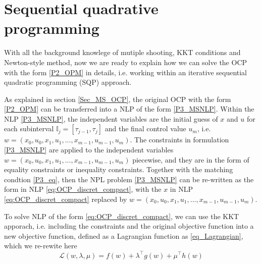 \documentclass  [
  paper    = a4,
  BCOR     = 10mm,
  twoside,
  fontsize = 12pt,
  fleqn,
  toc      = bibnumbered,
  toc      = listofnumbered,
  numbers  = noendperiod,
  headings = normal,
  listof   = leveldown,
  version  = 3.03
]                                       {scrreprt}
\newcommand{\<}{\langle}
\renewcommand{\>}{\rangle}
\begin{document}
\section{Sequential quadrative programming}
With all the background knowlege of mutiple shooting, KKT conditions and Newton-style method, now we are ready to explain how we can solve the OCP with the form \ref{P2_OPM} in details, i.e. working within an iterative sequential quadratic programming (SQP) approach. 

As explained in section \ref{Sec_MS_OCP}, the original OCP with the form \ref{P2_OPM} can be transferred into a NLP of the form \ref{P3_MSNLP}. Within the NLP  \ref{P3_MSNLP}, the independent variables are the initial guess of $x$ and $u$ for each subinterval $\mathbb{I}_j = [\tau_{j-1}, \tau_j]$ and the final control value $u_m$, i.e. $w = (x_0, u_0, x_1, u_1, ..., x_{m-1}, u_{m-1}, u_m)$. The constraints in formulation \ref{P3_MSNLP} are applied to the independent variables  $w = (x_0, u_0, x_1, u_1, ..., x_{m-1}, u_{m-1}, u_m)$ piecewise, and they are  in the form of equality constraints or inequality constraints. Together with the matching condtion \ref{P3_eq}, then the NPL problem  \ref{P3_MSNLP} can be re-written as the form in NLP \ref{eq:OCP_discret_compact}, with the $x$ in NLP \ref{eq:OCP_discret_compact} replaced by $w = (x_0, u_0, x_1, u_1, ..., x_{m-1}, u_{m-1}, u_m)$. 



To solve NLP of the form  \ref{eq:OCP_discret_compact}, we can use the KKT apporach, i.e. including the constraints and the original objective function into a new objective function, defined as a Lagrangian function as \ref{eq_Lagrangian}, which we re-rewite here 
\begin{equation}
	\mathcal{L}(w,\lambda, \mu) = f(w) + \lambda^\top g(w) +  \mu^\top h(w) 
\end{equation}
\end{document}
